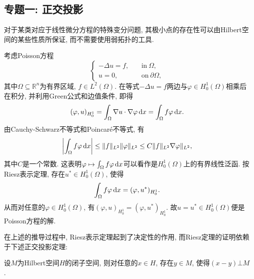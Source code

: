 \subsection{专题一: 正交投影}

对于某类对应于线性微分方程的特殊变分问题, 其极小点的存在性可以由Hilbert空间的某些性质所保证, 而不需要使用弱拓扑的工具.

\begin{example}
    考虑Poisson方程
    \begin{equation*}
        \begin{cases}
            -\Delta u = f, \quad &\text{in}\ \Omega, \\ 
            u = 0, \quad &\text{on}\ \partial\Omega,
        \end{cases}
    \end{equation*}
    其中$\Omega \subseteq \mathbb{R}^n$为有界区域, $f \in L^2(\Omega)$.
    在等式$-\Delta u = f$两边与$\varphi \in H_0^1(\Omega)$相乘后在积分, 并利用Green公式和边值条件, 即得 
    \begin{equation*}
        (\varphi, u)_{H_0^1} = \int_{\Omega}\nabla u \cdot \nabla\varphi \,{\rm d}x = \int_{\Omega}f\varphi \,{\rm d}x.
    \end{equation*}
    由Cauchy-Schwarz不等式和Poincar\'e不等式, 有 
    \begin{equation*}
        \left|\int_{\Omega}f\varphi \,{\rm d}x\right| \leq \Vert f \Vert_{L^2}\Vert \varphi\Vert_{L^2} \leq C\Vert f \Vert_{L^2}\nabla\varphi\Vert_{L^2},
    \end{equation*}
    其中$C$是一个常数. 这表明$\varphi \mapsto \int_{\Omega}f\varphi \,{\rm d}x$可以看作是$H_0^1(\Omega)$上的有界线性泛函.
    按Riesz表示定理, 存在$u^* \in H_0^1(\Omega)$, 使得 
    \begin{equation*}
        \int_{\Omega}f\varphi \,{\rm d}x = (\varphi, u^*)_{H_0^1}.
    \end{equation*}
    从而对任意的$\varphi \in H_0^1(\Omega)$, 有$(\varphi, u)_{H_0^1} = (\varphi, u^*)_{H_0^1}$.
    故$u = u^* \in H_0^1(\Omega)$便是Poisson方程的解.
\end{example}

在上述的推导过程中, Riesz表示定理起到了决定性的作用, 而Riesz定理的证明依赖于下述正交投影定理:

\begin{theorem}[正交投影]
    设$M$为Hilbert空间$H$的闭子空间, 则对任意的$x \in H$, 存在$y \in M$, 使得$(x - y) \bot M$.
\end{theorem}

